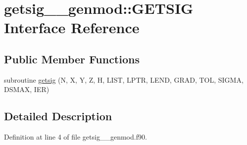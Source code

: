 \hypertarget{interfacegetsig____genmod_1_1GETSIG}{\section{getsig\+\_\+\+\_\+genmod\+:\+:G\+E\+T\+S\+I\+G Interface Reference}
\label{interfacegetsig____genmod_1_1GETSIG}
}
\subsection*{Public Member Functions}
\begin{DoxyCompactItemize}
\item 
subroutine \hyperlink{interfacegetsig____genmod_1_1GETSIG_a2b209781fb5b8c9191537cab37a396b4}{getsig} (N, X, Y, Z, H, L\+I\+S\+T, L\+P\+T\+R, L\+E\+N\+D, G\+R\+A\+D, T\+O\+L, S\+I\+G\+M\+A, D\+S\+M\+A\+X, I\+E\+R)
\end{DoxyCompactItemize}


\subsection{Detailed Description}


Definition at line 4 of file getsig\+\_\+\+\_\+genmod.\+f90.



